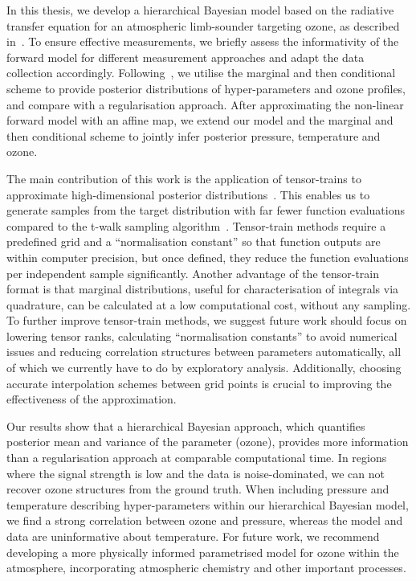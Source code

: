 In this thesis, we develop a hierarchical Bayesian model based on the radiative transfer equation for an atmospheric limb-sounder targeting ozone, as described in~\cite{mipas2000handbook}.
To ensure effective measurements, we briefly assess the informativity of the forward model for different measurement approaches and adapt the data collection accordingly.
Following~\cite{fox2016fast}, we utilise the marginal and then conditional scheme to provide posterior distributions of hyper-parameters and ozone profiles, and compare with a regularisation approach.
After approximating the non-linear forward model with an affine map, we extend our model and the marginal and then conditional scheme to jointly infer posterior pressure, temperature and ozone.

The main contribution of this work is the application of tensor-trains to approximate high-dimensional posterior distributions~\cite{cui2022deep, dolgov2020approximation}.
This enables us to generate samples from the target distribution with far fewer function evaluations compared to the t-walk sampling algorithm~\cite{christen2010general}.
Tensor-train methods require a predefined grid and a ``normalisation constant'' so that function outputs are within computer precision, but once defined, they reduce the function evaluations per independent sample significantly.
Another advantage of the tensor-train format is that marginal distributions, useful for characterisation of integrals via quadrature, can be calculated at a low computational cost, without any sampling.
To further improve tensor-train methods, we suggest future work should focus on lowering tensor ranks, calculating ``normalisation constants'' to avoid numerical issues and reducing correlation structures between parameters automatically, all of which we currently have to do by exploratory analysis.
Additionally, choosing accurate interpolation schemes between grid points is crucial to improving the effectiveness of the approximation.

Our results show that a hierarchical Bayesian approach, which quantifies posterior mean and variance of the parameter (ozone), provides more information than a regularisation approach at comparable computational time.
In regions where the signal strength is low and the data is noise-dominated, we can not recover ozone structures from the ground truth.
When including pressure and temperature describing hyper-parameters within our hierarchical Bayesian model, we find a strong correlation between ozone and pressure, whereas the model and data are uninformative about temperature.
For future work, we recommend developing a more physically informed parametrised model for ozone within the atmosphere, incorporating atmospheric chemistry and other important processes.